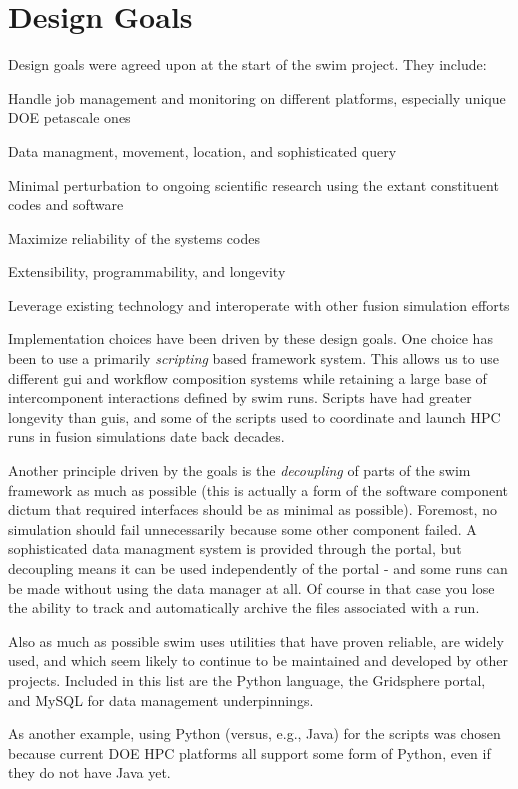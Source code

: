 \section{Design Goals}
\label{sec:design_goals}

Design goals were agreed upon at the start of the \ac{swim} project. They include:
\begin{itemizer}
\item{Handle job management and monitoring on different platforms, especially
unique DOE petascale ones}

\item{Data managment, movement, location, and sophisticated query}

\item{Minimal perturbation to ongoing scientific research using the extant
constituent codes and software}

\item{Maximize reliability of the systems codes}

\item{Extensibility, programmability, and longevity}

\item{Leverage existing technology and interoperate with other fusion
simulation efforts}

\end{itemizer}
Implementation choices have been driven by these design goals.
One choice has been to use a primarily {\em scripting} based framework system.
This allows us to use
different \ac{gui} and workflow composition systems while retaining a large base
of intercomponent interactions defined by \ac{swim} runs.  Scripts have had greater
longevity than \ac{gui}s, and some of the scripts used to coordinate and launch HPC
runs in fusion simulations date back decades.

Another principle driven by the goals is the {\em decoupling} of parts of the \ac{swim}
framework as much as possible (this is actually a form of the software component
dictum that required interfaces should be as minimal as possible).
Foremost, no simulation should fail unnecessarily because some other component
failed. A sophisticated data managment system is provided through the portal,
but decoupling means it can be used independently of the portal - and some runs
can be made without using the data manager at all. Of course in that case you
lose the ability to track and automatically archive the files associated with a
run.

Also as much as possible \ac{swim} uses utilities that have proven reliable, are
widely used, and which seem likely to continue to be maintained and developed
by other projects. Included in this list are the Python language, the Gridsphere
portal, and MySQL for data management underpinnings.

As another example, 
using Python (versus, e.g., Java)
for the scripts was chosen because current DOE HPC platforms all support some
form of Python, even if they do not have Java yet. 



